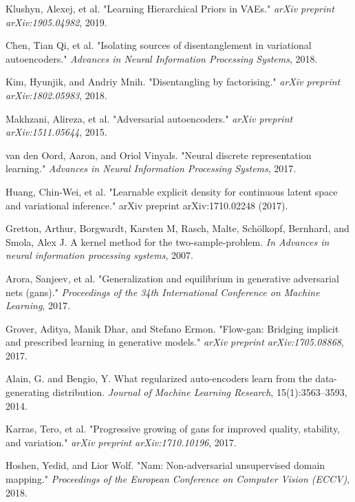 \documentclass{article}
\begin{document}
\begin{thebibliography}{9}
  Klushyn, Alexej, et al. "Learning Hierarchical Priors in VAEs." \textit{arXiv preprint arXiv:1905.04982}, 2019.

  Chen, Tian Qi, et al. "Isolating sources of disentanglement in variational autoencoders." \textit{Advances in Neural Information Processing Systems}, 2018.

  Kim, Hyunjik, and Andriy Mnih. "Disentangling by factorising." \textit{arXiv preprint arXiv:1802.05983}, 2018.

 Makhzani, Alireza, et al. "Adversarial autoencoders." \textit{arXiv preprint arXiv:1511.05644}, 2015.

  van den Oord, Aaron, and Oriol Vinyals. "Neural discrete representation learning." \textit{Advances in Neural Information Processing Systems}, 2017.

  Huang, Chin-Wei, et al. "Learnable explicit density for continuous latent space and variational inference." arXiv preprint arXiv:1710.02248 (2017).

  Gretton, Arthur, Borgwardt, Karsten M, Rasch, Malte, Schölkopf, Bernhard, and Smola, Alex J. A kernel method
  for the two-sample-problem. \textit{In Advances in neural information processing systems}, 2007.

   Arora, Sanjeev, et al. "Generalization and equilibrium in generative adversarial nets (gans)." \textit{Proceedings of the 34th International Conference on Machine Learning}, 2017.

   Grover, Aditya, Manik Dhar, and Stefano Ermon. "Flow-gan: Bridging implicit and prescribed learning in generative models." \textit{arXiv preprint arXiv:1705.08868}, 2017.

  Alain, G. and Bengio, Y. What regularized auto-encoders learn from the data-generating distribution. \textit{Journal of Machine
Learning Research}, 15(1):3563–3593, 2014.

 Karras, Tero, et al. "Progressive growing of gans for improved quality, stability, and variation." \textit{arXiv preprint arXiv:1710.10196}, 2017.

  Hoshen, Yedid, and Lior Wolf. "Nam: Non-adversarial unsupervised domain mapping." \textit{Proceedings of the European Conference on Computer Vision (ECCV)}, 2018.
\end{thebibliography}
\end{document}
